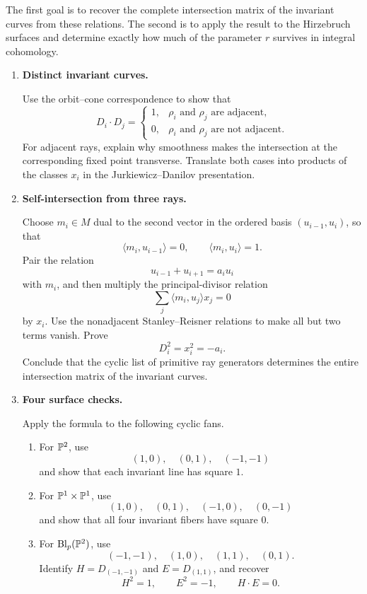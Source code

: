 The first goal is to recover the complete intersection matrix of the
invariant curves from these relations. The second is to apply the
result to the Hirzebruch surfaces and determine exactly how much of the
parameter \(r\) survives in integral cohomology.

\begin{enumerate}[label=\textbf{Hint \arabic*.},wide=0pt]

\item \textbf{Distinct invariant curves.}

Use the orbit--cone correspondence to show that
\[
D_i\cdot D_j
=
\begin{cases}
1,& \rho_i\text{ and }\rho_j\text{ are adjacent},\\
0,& \rho_i\text{ and }\rho_j\text{ are not adjacent}.
\end{cases}
\]
For adjacent rays, explain why smoothness makes the intersection at the
corresponding fixed point transverse. Translate both cases into
products of the classes \(x_i\) in the Jurkiewicz--Danilov
presentation.

\item \textbf{Self-intersection from three rays.}

Choose \(m_i\in M\) dual to the second vector in the ordered basis
\((u_{i-1},u_i)\), so that
\[
\langle m_i,u_{i-1}\rangle=0,
\qquad
\langle m_i,u_i\rangle=1.
\]
Pair the relation
\[
u_{i-1}+u_{i+1}=a_i u_i
\]
with \(m_i\), and then multiply the principal-divisor relation
\[
\sum_j\langle m_i,u_j\rangle x_j=0
\]
by \(x_i\). Use the nonadjacent Stanley--Reisner relations to make all
but two terms vanish. Prove
\[
\boxed{D_i^2=x_i^2=-a_i.}
\]
Conclude that the cyclic list of primitive ray generators determines
the entire intersection matrix of the invariant curves.

\item \textbf{Four surface checks.}

Apply the formula to the following cyclic fans.
\begin{enumerate}[label=(\alph*),wide=0pt]
\item For \(\mathbb{P}^2\), use
\[
(1,0),\quad(0,1),\quad(-1,-1)
\]
and show that each invariant line has square \(1\).

\item For \(\mathbb{P}^1\times\mathbb{P}^1\), use
\[
(1,0),\quad(0,1),\quad(-1,0),\quad(0,-1)
\]
and show that all four invariant fibers have square \(0\).

\item For \(\operatorname{Bl}_p(\mathbb{P}^2)\), use
\[
(-1,-1),\quad(1,0),\quad(1,1),\quad(0,1).
\]
Identify \(H=D_{(-1,-1)}\) and \(E=D_{(1,1)}\), and recover
\[
H^2=1,
\qquad
E^2=-1,
\qquad
H\cdot E=0.
\]


\end{enumerate}
\end{enumerate}
